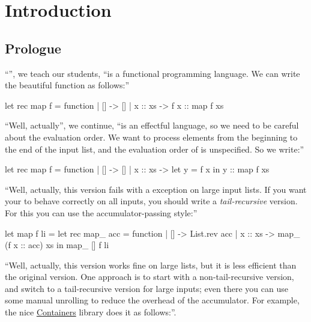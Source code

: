 \section{Introduction}

\subsection{Prologue}

``\OCaml'', we teach our students, ``is a functional programming language. We can write the beautiful function  as follows:''
\begin{Ocaml}
let rec map f = function
| [] -> []
| x :: xs -> f x :: map f xs
\end{Ocaml}

``Well, actually'', we continue, ``\OCaml is an effectful language, so we need to be careful about the evaluation order. We want  to process elements from the beginning to the end of the input list, and the evaluation order of  is unspecified. So we write:''
\begin{Ocaml}
let rec map f = function
| [] -> []
| x :: xs ->
  let y = f x in
  y :: map f xs
\end{Ocaml}

``Well, actually, this version fails with a 
exception on large input lists. If you want your  to behave
correctly on all inputs, you should write a \emph{tail-recursive}
version. For this you can use the accumulator-passing style:''
\begin{Ocaml}
let map f li =
  let rec map_ acc = function
  | [] -> List.rev acc
  | x :: xs -> map_ (f x :: acc) xs
  in map_ [] f li
\end{Ocaml}

``Well, actually, this version works fine on large lists, but it is
less efficient than the original version. One approach is to start with
a non-tail-recursive version, and switch to a tail-recursive version
for large inputs; even there you can use some manual unrolling to
reduce the overhead of the accumulator. For example, the nice
\href{https://github.com/c-cube/ocaml-containers}{Containers} library
does it as follows:''.

